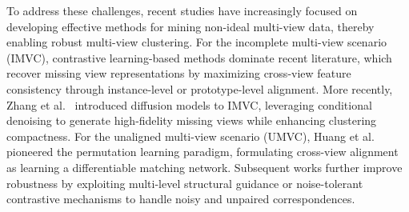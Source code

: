 \documentclass{article}
\theoremstyle{plain}
\theoremstyle{definition}
\theoremstyle{remark}
\begin{document}
To address these challenges, recent studies have increasingly focused on developing effective methods for mining non-ideal multi-view data, thereby enabling robust multi-view clustering. 
For the incomplete multi-view scenario (IMVC), contrastive learning-based methods \cite{linCOMPLETERIncompleteMultiview2021,yangRobustMultiViewClustering2023,jinDeepIncompleteMultiView2023} dominate recent literature, which recover missing view representations by maximizing cross-view feature consistency through instance-level or prototype-level alignment. More recently, Zhang et al.\ \cite{zhangIncompleteMultiviewClustering2025a} introduced diffusion models to IMVC, leveraging conditional denoising to generate high-fidelity missing views while enhancing clustering compactness. For the unaligned multi-view scenario (UMVC), Huang et al.\ \cite{huangPartiallyViewalignedClustering2020a} pioneered the permutation learning paradigm, formulating cross-view alignment as learning a differentiable matching network. Subsequent works \cite{xinMultilevelReliableGuidance2025,guoRobustContrastiveMultiview2024a} further improve robustness by exploiting multi-level structural guidance or noise-tolerant contrastive mechanisms to handle noisy and unpaired correspondences.

\end{document}
